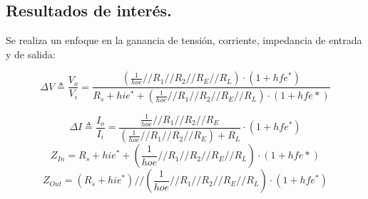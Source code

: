 \documentclass[a4paper]{article}
\begin{document}
\subsection{Resultados de interés.}
Se realiza un enfoque en la ganancia de tensión, corriente, impedancia de entrada y de salida:


\begin{equation}
	\Delta V \triangleq \frac{V_o}{V_i} = \frac{ \left(\frac{1}{hoe} // R_1 // R_2 // R_E // R_L  \right)\cdot (1+hfe^*)}{R_s + hie^* + \left(\frac{1}{hoe} // R_1 // R_2 // R_E // R_L  \right)\cdot (1+hfe*) } 
\end{equation}

\begin{equation} \Delta I \triangleq \frac{I_o}{I_i} =  \frac{\frac{1}{hoe} // R_1 // R_2 // R_E}{(\frac{1}{hoe} // R_1 // R_2 // R_E)+R_L} \cdot (1+hfe^*)
\end{equation}
\begin{equation} Z_{In} = R_s + hie^* + \left(\frac{1}{hoe} // R_1 // R_2 // R_E // R_L  \right)\cdot (1+hfe*)\end{equation}
\begin{equation} Z_{Out} = (R_s + hie^*) //  \left(\frac{1}{hoe} // R_1 // R_2 // R_E // R_L  \right)\cdot (1+hfe^*)\end{equation}
\end{document}
